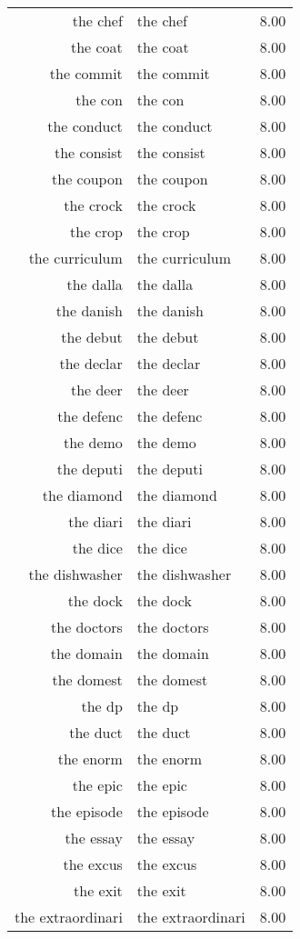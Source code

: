 \begin{table}[ht]
\begin{tabular}{rlr}
  the chef & the chef & 8.00 \\ 
  the coat & the coat & 8.00 \\ 
  the commit & the commit & 8.00 \\ 
  the con & the con & 8.00 \\ 
  the conduct & the conduct & 8.00 \\ 
  the consist & the consist & 8.00 \\ 
  the coupon & the coupon & 8.00 \\ 
  the crock & the crock & 8.00 \\ 
  the crop & the crop & 8.00 \\ 
  the curriculum & the curriculum & 8.00 \\ 
  the dalla & the dalla & 8.00 \\ 
  the danish & the danish & 8.00 \\ 
  the debut & the debut & 8.00 \\ 
  the declar & the declar & 8.00 \\ 
  the deer & the deer & 8.00 \\ 
  the defenc & the defenc & 8.00 \\ 
  the demo & the demo & 8.00 \\ 
  the deputi & the deputi & 8.00 \\ 
  the diamond & the diamond & 8.00 \\ 
  the diari & the diari & 8.00 \\ 
  the dice & the dice & 8.00 \\ 
  the dishwasher & the dishwasher & 8.00 \\ 
  the dock & the dock & 8.00 \\ 
  the doctors & the doctors & 8.00 \\ 
  the domain & the domain & 8.00 \\ 
  the domest & the domest & 8.00 \\ 
  the dp & the dp & 8.00 \\ 
  the duct & the duct & 8.00 \\ 
  the enorm & the enorm & 8.00 \\ 
  the epic & the epic & 8.00 \\ 
  the episode & the episode & 8.00 \\ 
  the essay & the essay & 8.00 \\ 
  the excus & the excus & 8.00 \\ 
  the exit & the exit & 8.00 \\ 
  the extraordinari & the extraordinari & 8.00 \\ 

\end{tabular}
\end{table}
